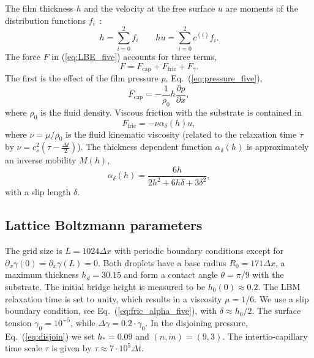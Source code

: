 The film thickness $h$ and the velocity at the free surface $u$ are moments of the distribution functions $f_i$~\cite{Salmon:1999:0022-2402:503, PhysRevE.65.036309, PhysRevE.104.034801}:
\begin{equation}\label{eq:hydrofields_five}
    h= \sum_{i=0}^2 f_i \qquad hu = \sum_{i=0}^2 c^{(i)} f_i.
\end{equation}
The force $F$ in (\ref{eq:LBE_five}) accounts for three terms,
\begin{equation}\label{eq:force_five}
    F = F_{\text{cap}} + F_{\text{fric}} + F_{\gamma}.  
\end{equation}
The first is the effect of the film pressure $p$, Eq.~(\ref{eq:pressure_five}), 
\begin{equation}\label{eq:capillary_force_five}
    F_{\text{cap}} = -\frac{1}{\rho_0} h \frac{\partial p}{\partial x},
\end{equation}
where $\rho_0$ is the fluid density. 
Viscous friction with the substrate is contained in
\begin{equation}\label{eq:fric_force_five}
    F_{\text{fric}} = -\nu \alpha_{\delta}(h) u,
\end{equation}
where $\nu=\mu/\rho_0$ is the fluid kinematic viscosity (related to the relaxation time $\tau$ by $\nu = c_s^2\left(\tau-\frac{\Delta t}{2}\right)$).
The thickness dependent function $\alpha_{\delta}(h)$ is approximately an inverse mobility $M(h)$,
\begin{equation}\label{eq:fric_alpha_five}
     \alpha_{\delta}(h) = \frac{6 h}{2h^2 + 6h\delta + 3\delta^2},
\end{equation}
with a slip length $\delta$.

\subsection{Lattice Boltzmann parameters}\label{app:one}
The grid size is $L=1024\Delta x$ with periodic boundary conditions except for $\partial_x\gamma(0) = \partial_x\gamma(L) = 0$.
Both droplets have a base radius $R_0 = 171\Delta x$, a maximum thickness $h_d = 30.15$ and form a contact angle $\theta = \pi/9$ with the substrate.
The initial bridge height is measured to be $h_0(0) \approx 0.2$.
The LBM relaxation time is set to unity, which results in a viscosity $\mu = 1/6$. 
We use a slip boundary condition, see Eq.~(\ref{eq:fric_alpha_five}), with $\delta \approx h_0/2$.
The surface tension $\gamma_0 = 10^{-5}$, while $\Delta\gamma = 0.2\cdot \gamma_0$.
In the disjoining pressure, Eq.~(\ref{eq:disjoin}) we set $h_{\ast} = 0.09$ and $(n,m) = (9,3)$.
The intertio-capillary time scale $\tau$ is given by $\tau \approx 7\cdot 10^5 \Delta t$. 